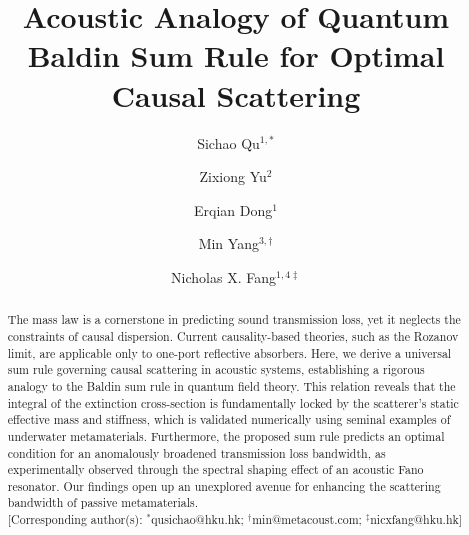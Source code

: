 \documentclass[final,5p,times,twocolumn]{elsarticle}
\begin{document}
\begin{frontmatter}
\title{\textbf{Acoustic Analogy of Quantum Baldin Sum Rule for Optimal Causal Scattering}}

\author{Sichao Qu$^{1,*}$}
\author{Zixiong Yu$^{2}$}
\author{Erqian Dong$^{1}$}
\author{Min Yang$^{3,\dag}$}
\author{Nicholas X. Fang$^{1,4\ddag}$}










\begin{abstract}
	\begin{center}
	\begin{minipage}{0.95\textwidth}
	\vspace{-2mm}
	The mass law is a cornerstone in predicting sound transmission loss, yet it neglects the constraints of causal dispersion. Current causality-based theories, such as the Rozanov limit, are applicable only to one-port reflective absorbers. Here, we derive a universal sum rule governing causal scattering in acoustic systems, establishing a rigorous analogy to the Baldin sum rule in quantum field theory. This relation reveals that the integral of the extinction cross-section is fundamentally locked by the scatterer’s static effective mass and stiffness, which is validated numerically using seminal examples of underwater metamaterials. Furthermore, the proposed sum rule predicts an optimal condition for an anomalously broadened transmission loss bandwidth, as experimentally observed through the spectral shaping effect of an acoustic Fano resonator. Our findings open up an unexplored avenue for enhancing the scattering bandwidth of passive metamaterials.
	\\
	{\small [Corresponding author(s): $^{*}$qusichao@hku.hk; $^{\dag}$min@metacoust.com; $^{\ddag}$nicxfang@hku.hk]}
	\end{minipage}
	\end{center}
\end{abstract}
\end{frontmatter}
\end{document}

